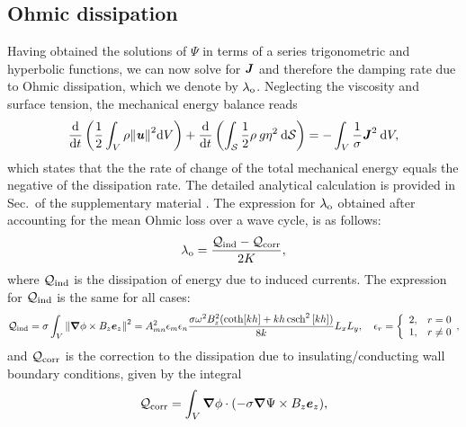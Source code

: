 \documentclass[aps,prfluids,reprint,superscriptaddress]{revtex4-2}
\newcommand{\h}[1]{\textbf{\textit{#1}}}
\newcommand{\RN}[1]{%
	\textup{\uppercase\expandafter{\romannumeral#1}}%
}
\begin{document}
\subsection{Ohmic dissipation}
\label{sec:ohmic_dissipation}

\indent Having obtained the solutions of $\Psi$ in terms of a series trigonometric and hyperbolic functions, we can now solve for $\h J$ and therefore the damping rate due to Ohmic dissipation, which we denote by $\lambda_{\rm o}$. Neglecting the viscosity and surface tension, the mechanical energy balance reads
\begin{equation}
	 \dv{}{t}\left( \frac{1}{2} 
	 \int_{V} \rho \norm{\h u}^2 \mathrm dV  \right)
	 +
	 \dv{}{t}\left( \int_{\mathcal{S}} 
	 \frac{1}{2} \rho \:g\eta^2  \: \mathrm d\mathcal{S}  
	 \right)
	  = -
	  \int_{V} \frac{1}{\sigma} \h J^2 \: \mathrm dV ,
	  \label{eq:balance_ohmic}
\end{equation}
which states that the the rate of change of the total mechanical energy equals
the negative of the dissipation rate. The detailed analytical calculation is provided in Sec.\,\RN{2} of the supplementary material \cite{SMmagdamp_hegde}. The expression for $\lambda_{\rm o}$ obtained after accounting for the mean Ohmic loss over a wave cycle, is as follows:
\begin{equation}
	\lambda_{\rm o} = 
	\dfrac{
		\mathcal{Q}_{\rm ind}
		-\mathcal{Q}_{\rm corr}	}{2 K},
	\label{eq:mag_damping_rate_short}
\end{equation}
where $\mathcal{Q}_{\rm ind}$ is the dissipation of energy due to induced currents. The expression for $\mathcal{Q}_{\rm ind}$ is the same for all cases:
\begin{equation}
	\mathcal{Q}_{\rm ind} = 
	\sigma \int_{V}  \norm{\bm{\nabla} {\phi}\times B_z\bm e_z}^2
	=
	A^2_{mn}
	\epsilon_{m}\epsilon_{n}\frac{ \sigma
		\omega^2B_z^2(\coth[kh]+kh\csch^2{[kh]})}{8k}L_xL_y ,
		\quad 
	\epsilon_{r} =
	\biggl\{ \begin{array}{rc}
		2,  & r= 0 \\
		1,  & r\neq 0
	\end{array}	,
	\label{eq:qind}
\end{equation}
and $\mathcal{Q}_{\rm corr}$ is the correction to the dissipation due to insulating/conducting wall boundary conditions, given by the integral
\begin{equation}
	\mathcal{Q}_{\rm corr} =
	\int_{V} \bm{\nabla} {\phi}\cdot (-\sigma \bm{\nabla}{\Psi} \times B_z\bm{e}_z ),
	\label{eq:Qcorr_integral}
\end{equation}
\end{document}

